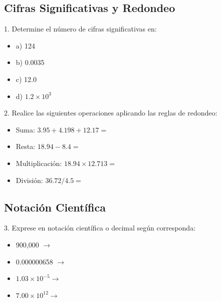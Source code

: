 \documentclass[a4paper,12pt]{article}
\begin{document}
\subsection{Cifras Significativas y Redondeo}
1. Determine el número de cifras significativas en:
\begin{itemize}
    \item a) 124 \hfill \underline{\hspace{2cm}}
    \item b) 0.0035 \hfill \underline{\hspace{2cm}}
    \item c) 12.0 \hfill \underline{\hspace{2cm}}
    \item d) $1.2 \times 10^3$ \hfill \underline{\hspace{2cm}}
\end{itemize}

2. Realice las siguientes operaciones aplicando las reglas de redondeo:
\begin{itemize}
    \item Suma: $3.95 + 4.198 + 12.17 =$ \underline{\hspace{3cm}}
    \item Resta: $18.94 - 8.4 =$ \underline{\hspace{3cm}}
    \item Multiplicación: $18.94 \times 12.713 =$ \underline{\hspace{3cm}}
    \item División: $36.72 / 4.5 =$ \underline{\hspace{3cm}}
\end{itemize}

\subsection{Notación Científica}
3. Exprese en notación científica o decimal según corresponda:
\begin{itemize}
    \item 900,000 $\rightarrow$ \underline{\hspace{4cm}}
    \item 0.000000658 $\rightarrow$ \underline{\hspace{4cm}}
    \item $1.03 \times 10^{-5} \rightarrow$ \underline{\hspace{4cm}}
    \item $7.00 \times 10^{12} \rightarrow$ \underline{\hspace{4cm}}
\end{itemize}
\end{document}
